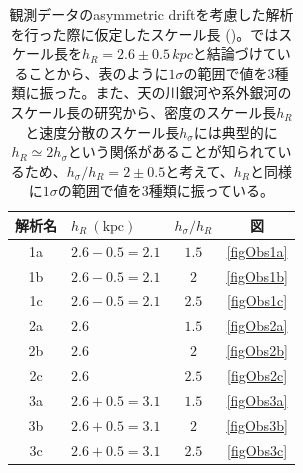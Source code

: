 \begin{table}
\begin{center}
\begin{tabular}{c|l|c|c} \hline
 \rowcolor{LightCyan}
 解析名 & $h_R\ \mathrm{(kpc)}$ & $ h_{\sigma}/h_R$ & 図\\
 \hline
 1a & $2.6 - 0.5 = 2.1$ & $1.5$ & \ref{figObs1a}\\
 1b & $2.6 - 0.5 = 2.1$ & $2$ & \ref{figObs1b}\\
 1c & $2.6 - 0.5 = 2.1$ & $2.5$ & \ref{figObs1c}\\
 \hline
 2a & $2.6$ & $1.5$ & \ref{figObs2a}\\
 2b & $2.6$ & $2$ & \ref{figObs2b}\\
 2c & $2.6$ & $2.5$ & \ref{figObs2c}\\
 \hline
 3a & $2.6 + 0.5 = 3.1$ & $1.5$ & \ref{figObs3a}\\
 3b & $2.6 + 0.5 = 3.1$ & $2$ & \ref{figObs3b}\\
 3c & $2.6 + 0.5 = 3.1$ & $2.5$ & \ref{figObs3c}\\
 \hline
\end{tabular}
\caption{観測データのasymmetric driftを考慮した解析を行った際に仮定したスケール長 (\cite{BH2016})。\cite{BH2016}ではスケール長を$h_R = 2.6\pm0.5\,\si{kpc}$と結論づけていることから、表のように$1\sigma$の範囲で値を3種類に振った。また、天の川銀河や系外銀河のスケール長の研究から、密度のスケール長$h_R$と速度分散のスケール長$h_{\sigma}$には典型的に$h_R \simeq 2h_{\sigma}$という関係があることが知られているため、$h_{\sigma}/h_R = 2\pm0.5$と考えて、$h_R$と同様に$1\sigma$の範囲で値を3種類に振っている。}
\label{scalelength}
\end{center}
\end{table}


